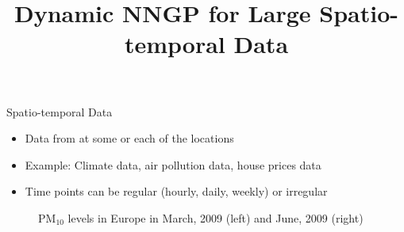 



\title[]{Dynamic NNGP for Large Spatio-temporal Data}




\maketitle

\begin{frame}{Spatio-temporal Data}
	\begin{itemize}
		\item Data from  at some or each of the locations
		\item Example: Climate data, air pollution data, house prices data
		\item Time points can be regular (hourly, daily, weekly) or irregular 
	\end{itemize}
	\vskip-9mm\begin{figure}[]
		\begin{center}
			{}
		\end{center}
	\vskip -8mm \caption{PM$_{10}$ levels in Europe in March, 2009 (left) and June, 2009 (right)}
	\end{figure}
\end{frame}

